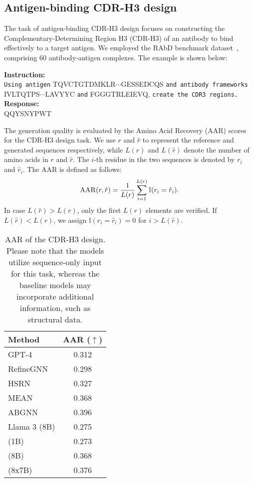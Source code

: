 \subsection{Antigen-binding CDR-H3 design}

The task of antigen-binding CDR-H3 design focuses on constructing the Complementary-Determining Region H3 (CDR-H3) of an antibody to bind effectively to a target antigen. We employed the RAbD benchmark dataset~\cite{adolf2018rabd}, comprising 60 antibody-antigen complexes. The example is shown below:

\begin{mdframed}
\noindent\textbf{Instruction: }\\
\texttt{Using antigen} \pro{}TQVCTGTDMKLR$\cdots$GESSEDCQS\epro{} \texttt{and antibody frameworks} \ant{}IVLTQTPS$\cdots$LAVYYC\eant{} \texttt{and} \ant{}FGGGTRLEIEVQ\eant{}, \texttt{create the CDR3 regions.}\\
\textbf{Response: }\\ 
\ant{}QQYSNYPWT\eant{}
\end{mdframed}  



The generation quality is evaluated by the Amino Acid Recovery (AAR) scores for the CDR-H3 design task. We use $r$ and $\hat{r}$ to represent the reference and generated sequences respectively, while $L(r)$ and $L(\hat{r})$ denote the number of amino acids in $r$ and $\hat{r}$. The $i$-th residue in the two sequences is denoted by $r_i$ and $\hat{r}_i$. The AAR is defined as follows:
\begin{equation}
{\rm AAR}(r,\hat{r}) = \frac{1}{L(r)}\sum_{i=1}^{L(r)}\mathbb{I}(r_i = \hat{r}_i). 
\end{equation}
In case $L(\hat{r})>L(r)$, only the first $L(r)$ elements are verified. If $L(\hat{r})<L(r)$, we assign $\mathbb{I}(r_i = \hat{r}_i)=0$ for $i>L(\hat{r})$.


\begin{table}[!h]
\centering
\begin{tabular}{lc}
\toprule
Method & AAR ($\uparrow$) \\
\midrule
GPT-4 & 0.312 \\
RefineGNN~\cite{jin2021refinegnn} & 0.298 \\
HSRN~\cite{jin2022hsrn} & 0.327 \\
MEAN~\cite{kong2022mean} & 0.368 \\
ABGNN~\cite{gao2023abgnn} & 0.396 \\
\midrule
Llama 3 (8B) & 0.275 \\
\ourM{} (1B) & 0.273 \\
\ourM{} (8B) & 0.368 \\
\ourM{} (8x7B) & 0.376 \\
\bottomrule
\end{tabular}
\caption{AAR of the CDR-H3 design. Please note that the \ourM{} models utilize sequence-only input for this task, whereas the baseline models may incorporate additional information, such as structural data.}
\label{tab:protein:antibody:cdr3GenGiven_antigen}
\end{table}


